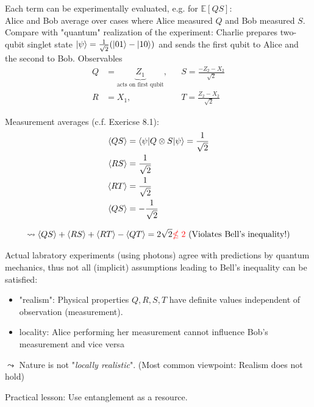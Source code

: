 Each term can be experimentally evaluated, e.g. for $\mathbb{E}[QS]$: \\
Alice and Bob average over cases where Alice measured $Q$ and Bob measured $S$. \\

Compare with "quantum" realization of the experiment: 
Charlie prepares two-qubit singlet state $\lvert\psi\rangle = \frac{1}{\sqrt{2}} (\lvert01\rangle - \lvert10\rangle)$
and sends the first qubit to Alice and the second to Bob.
Observables
\begin{align*}
    Q &= \underbrace{Z_1}_{\text{acts on first qubit}}, 
        &&S = \frac{-Z_2 - X_2}{\sqrt{2}} \\
    R &= X_1, &&T = \frac{Z_2 - X_2}{\sqrt{2}}
\end{align*}

Measurement averages (c.f. Exericse 8.1):
\begin{align*}
    \left\langle  QS \right\rangle &= \left \langle \psi \middle| Q \otimes S \middle| \psi \right \rangle = \frac{1}{\sqrt{2}} \\
    \left\langle  RS \right\rangle &= \frac{1}{\sqrt{2}} \\
    \left\langle  RT \right\rangle &= \frac{1}{\sqrt{2}} \\
    \left\langle  QS \right\rangle &= -\frac{1}{\sqrt{2}} 
\end{align*}

\begin{equation*}
    \leadsto  
        \left\langle  QS \right\rangle + 
        \left\langle  RS \right\rangle + 
        \left\langle  RT \right\rangle - 
        \left\langle  QT \right\rangle = 2 \sqrt{2} {\color{red} \nleq 2} \text{ (Violates Bell's inequality!)}
\end{equation*}

Actual labratory experiments (using photons) agree with predictions by quantum mechanics, 
thus not all (implicit) assumptions leading to Bell's inequality can be satisfied: \\

\begin{itemize}
    \item "realism": Physical properties $Q, R, S, T$ have definite values independent of observation
    (measurement).
    \item locality: Alice performing her measurement cannot influence Bob's measurement and vice versa
\end{itemize}

$\leadsto$  Nature is not "\textit{locally realistic}". 
(Most common viewpoint: Realism does not hold)

Practical lesson: Use entanglement as a resource.
